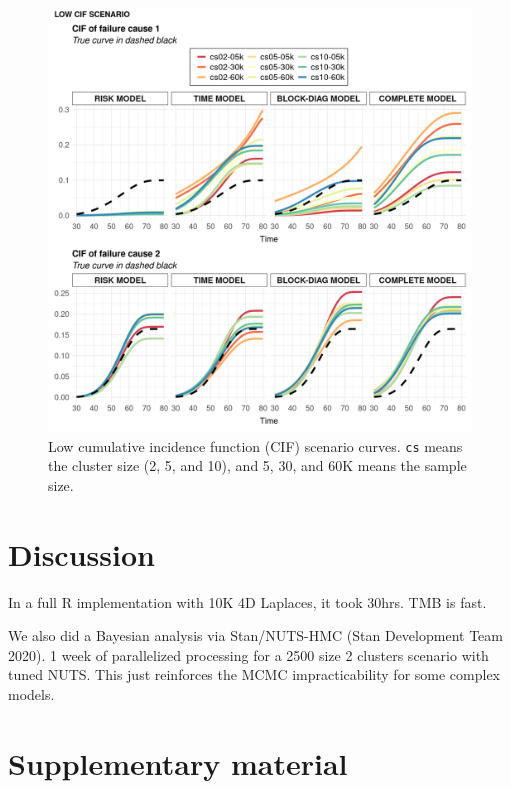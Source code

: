 \documentclass[a4paper,12pt]{article}
\begin{document}
\begin{figure}[H]
 \centering
 \includegraphics[width=\linewidth]{../../THESIS/thesis/figures/cifs-2.png}
 \vspace{-0.75cm}
 \caption{Low cumulative incidence function (CIF) scenario
   curves. \texttt{cs} means the cluster size (2, 5, and 10), and 5, 30,
   and 60K means the sample size.}
 \label{fig:cifslow}
\end{figure}

\section{Discussion}
\label{discussion}

In a full R implementation with 10K 4D Laplaces, it took 30hrs. TMB is
fast.

We also did a Bayesian analysis via Stan/NUTS-HMC (Stan Development Team
2020). 1 week of parallelized processing for a 2500 size 2 clusters
scenario with tuned NUTS. This just reinforces the MCMC impracticability
for some complex models.

\section*{Supplementary material}



\end{document}
